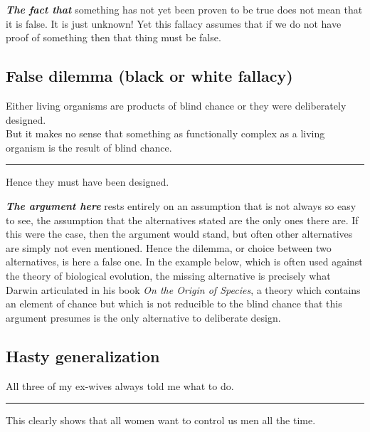 \documentclass[]{book}
\makeatletter
\newenvironment{kframe}{%
\medskip{}
\setlength{\fboxsep}{.8em}
 \def\at@end@of@kframe{}%
 \ifinner\ifhmode%
  \def\at@end@of@kframe{\end{minipage}}%
  \begin{minipage}{\columnwidth}%
 \fi\fi%
 \def\FrameCommand##1{\hskip\@totalleftmargin \hskip-\fboxsep
 \colorbox{shadecolor}{##1}\hskip-\fboxsep
     \hskip-\linewidth \hskip-\@totalleftmargin \hskip\columnwidth}%
 \MakeFramed {\advance\hsize-\width
   \@totalleftmargin\z@ \linewidth\hsize
   \@setminipage}}%
 {\par\unskip\endMakeFramed%
 \at@end@of@kframe}
\newenvironment{rmdblock}[1]
  {
  \begin{itemize}
  \renewcommand{\labelitemi}{
    \raisebox{-.7\height}[0pt][0pt]{
      {\setkeys{Gin}{width=3em,keepaspectratio}\texttt{[image: img/\#1]}}
    }
  }
  \setlength{\fboxsep}{1em}
  \begin{kframe}
  \item
  }
  {
  \end{kframe}
  \end{itemize}
  }
\newenvironment{rmdwarning}
  {\begin{rmdblock}{warning}}
  {\end{rmdblock}}
\makeatother
\begin{document}
\textbf{\emph{The fact that}} something has not yet been proven to be true does not mean that it is false. It is just unknown! Yet this fallacy assumes that if we do not have proof of something then that thing must be false.

\hypertarget{false-dilemma-black-or-white-fallacy}{%
\subsection*{False dilemma (black or white fallacy)}\label{false-dilemma-black-or-white-fallacy}}


\begin{rmdwarning}
Either living organisms are products of blind chance or they were
deliberately designed.\\
But it makes no sense that something as functionally complex as a living
organism is the result of blind chance.

\begin{center}\rule{0.5\linewidth}{\linethickness}\end{center}

Hence they must have been designed.
\end{rmdwarning}

\textbf{\emph{The argument here}} rests entirely on an assumption that is not always so easy to see, the assumption that the alternatives stated are the only ones there are. If this were the case, then the argument would stand, but often other alternatives are simply not even mentioned. Hence the dilemma, or choice between two alternatives, is here a false one. In the example below, which is often used against the theory of biological evolution, the missing alternative is precisely what Darwin articulated in his book \emph{On the Origin of Species}, a theory which contains an element of chance but which is not reducible to the blind chance that this argument presumes is the only alternative to deliberate design.

\hypertarget{hasty-generalization}{%
\subsection*{Hasty generalization}\label{hasty-generalization}}


\begin{rmdwarning}
All three of my ex-wives always told me what to do.

\begin{center}\rule{0.5\linewidth}{\linethickness}\end{center}

This clearly shows that all women want to control us men all the time.
\end{rmdwarning}
\end{document}
